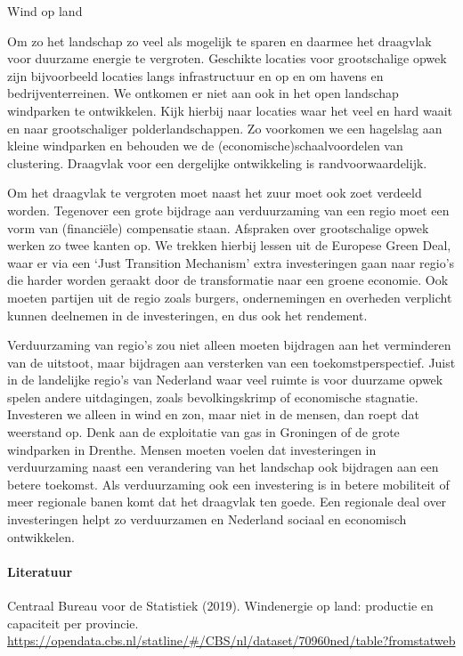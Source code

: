 \begin{voorstel}{Wind op land}
\begin{aanbevelingen}
Om zo het landschap zo veel als mogelijk te sparen en daarmee het draagvlak voor duurzame energie te vergroten. Geschikte locaties voor grootschalige opwek zijn bijvoorbeeld locaties langs infrastructuur en op en om havens en bedrijventerreinen. We ontkomen er niet aan ook in het open landschap windparken te ontwikkelen. Kijk hierbij naar locaties waar het veel en hard waait en naar grootschaliger polderlandschappen. Zo voorkomen we een hagelslag aan kleine windparken en behouden we de (economische)schaalvoordelen van clustering. Draagvlak voor een dergelijke ontwikkeling is randvoorwaardelijk.

Om het draagvlak te vergroten moet naast het zuur moet ook zoet verdeeld worden. Tegenover een grote bijdrage aan verduurzaming van een regio moet een vorm van (financiële) compensatie staan. Afspraken over grootschalige opwek werken zo twee kanten op. We trekken hierbij lessen uit de Europese Green Deal, waar er via een ‘Just Transition Mechanism’ extra investeringen gaan naar regio’s die harder worden geraakt door de transformatie naar een groene economie. Ook moeten partijen uit de regio zoals burgers, ondernemingen en overheden verplicht kunnen deelnemen in de investeringen, en dus ook het rendement.

Verduurzaming van regio’s zou niet alleen moeten bijdragen aan het verminderen van de \COO uitstoot, maar bijdragen aan versterken van een toekomstperspectief. Juist in de landelijke regio’s van Nederland waar veel ruimte is voor duurzame opwek spelen andere uitdagingen, zoals bevolkingskrimp of economische stagnatie. Investeren we alleen in wind en zon, maar niet in de mensen, dan roept dat weerstand op. Denk aan de exploitatie van gas in Groningen of de grote windparken in Drenthe. Mensen moeten voelen dat investeringen in verduurzaming naast een verandering van het landschap ook bijdragen aan een betere toekomst. Als verduurzaming ook een investering is in betere mobiliteit of meer regionale banen komt dat het draagvlak ten goede. Een regionale deal over investeringen helpt zo verduurzamen en Nederland sociaal en economisch ontwikkelen.
\end{aanbevelingen}

\paragraph{Literatuur}
Centraal Bureau voor de Statistiek (2019). Windenergie op land: productie en capaciteit per provincie. \url{https://opendata.cbs.nl/statline/#/CBS/nl/dataset/70960ned/table?fromstatweb}


\end{voorstel}
